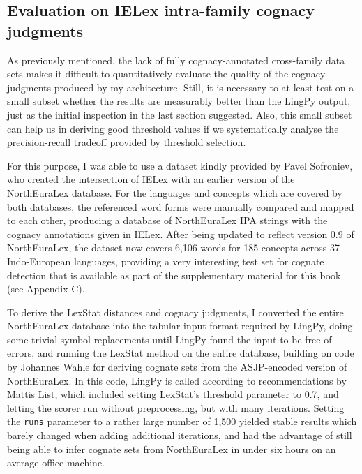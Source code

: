 \subsection{Evaluation on IELex intra-family cognacy judgments}
As previously mentioned, the lack of fully cognacy-annotated cross-family data sets makes it difficult to quantitatively evaluate the quality of the cognacy judgments produced by my architecture. Still, it is necessary to at least test on a small subset whether the results are measurably better than the LingPy output, just as the initial inspection in the last section suggested. Also, this small subset can help us in deriving good threshold values if we systematically analyse the precision-recall tradeoff provided by threshold selection.

For this purpose, I was able to use a dataset kindly provided by Pavel Sofroniev, who created the intersection of IELex with an earlier version of the NorthEuraLex database. For the languages and concepts which are covered by both databases, the referenced word forms were manually compared and mapped to each other, producing a database of NorthEuraLex IPA strings with the cognacy annotations given in IELex. After being updated to reflect version 0.9 of NorthEuraLex, the dataset now covers 6,106 words for 185 concepts across 37 Indo-European languages, providing a very interesting test set for cognate detection that is available as part of the supplementary material for this book (see Appendix C).

To derive the LexStat distances and cognacy judgments, I converted the entire NorthEuraLex database into the tabular input format required by LingPy, doing some trivial symbol replacements until LingPy found the input to be free of errors, and running the LexStat method on the entire database, building on code by Johannes Wahle for deriving cognate sets from the ASJP-encoded version of NorthEuraLex. In this code, LingPy is called according to recommendations by Mattis List, which included setting LexStat's threshold parameter to 0.7, and letting the scorer run without preprocessing, but with many iterations. Setting the \texttt{runs} parameter to a rather large number of 1,500 yielded stable results which barely changed when adding additional iterations, and had the advantage of still being able to infer cognate sets from NorthEuraLex in under six hours on an average office machine.

